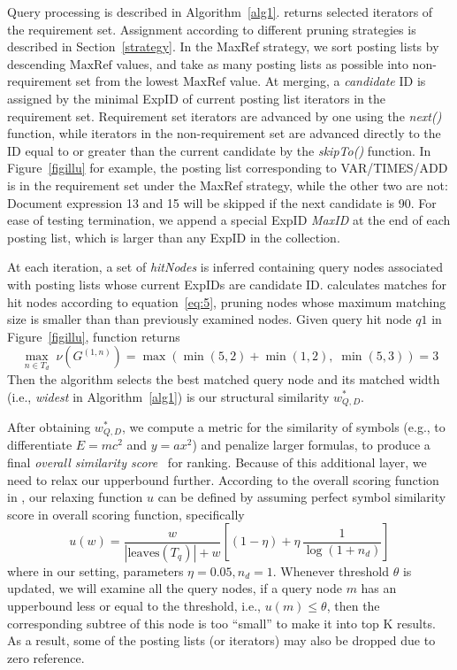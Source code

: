 \documentclass[runningheads]{llncs}
\begin{document}
Query processing is described in Algorithm~\ref{alg1}.
 returns selected iterators of the requirement set.
Assignment according to different pruning strategies is described in Section~\ref{strategy}.
%
In the MaxRef strategy, we sort posting lists by descending $\text{MaxRef}$ values, and take as many posting lists as possible into non-requirement set from the lowest $\text{MaxRef}$ value.
At merging, a \textit{candidate} ID is assigned by the minimal ExpID of current posting list iterators in the requirement set.
Requirement set iterators are advanced by one using the \textit{next()} function, while iterators in the non-requirement set are advanced directly to the ID equal to or greater than the current candidate by the \textit{skipTo()} function. In Figure~\ref{figillu} for example, the posting list corresponding to VAR/TIMES/ADD is in the requirement set under the MaxRef strategy, while the other two are not: Document expression 13 and 15 will be skipped if the next candidate is 90.
%
For ease of testing termination, we append a special ExpID \emph{MaxID} at the end of each posting list, which is larger than any ExpID in the collection.

At each iteration, a set of \textit{hitNodes} is inferred containing query nodes associated with posting lists whose current ExpIDs are candidate ID.
 calculates matches for hit nodes according to equation~\ref{eq:5}, pruning nodes whose maximum matching size is smaller than than previously examined nodes.
%
Given query hit node $q1$ in Figure~\ref{figillu}, function  returns
$$\max_{n\in T_d}\;\nu(G^{(1, n)}) = \max(\min(5, 2) + \min(1, 2),\; \min(5, 3)) = 3$$
Then the algorithm selects the best matched query node and its matched width (i.e., \emph{widest} in Algorithm~\ref{alg1}) is our structural similarity $w^*_{Q, D}$.

After obtaining $w^*_{Q, D}$, we compute a metric for the similarity of symbols (e.g., to differentiate $E=mc^2$ and $y=ax^2$) and penalize larger formulas, to produce a final \emph{overall similarity score}~\cite{a0_2019} for ranking.
Because of this additional layer, we need to relax our upperbound further.
According to the overall scoring function in \cite{a0_2019}, our relaxing function $u$ can be defined by assuming perfect symbol similarity score in overall scoring function, specifically
\begin{equation}
u(w) = \frac{w}{|\text{leaves}(T_q)| + w} \left[ (1 - \eta) + \eta \, \frac 1 {\log (1 + n_d)} \right]
\end{equation}
where in our setting,  parameters $\eta = 0.05, n_d = 1$.
%
Whenever threshold $\theta$ is updated, we will examine all the query nodes, if a query node $m$ has an upperbound less or equal to the threshold, i.e., $u(m) \le \theta$, then the corresponding subtree of this node is too ``small'' to make it into top K results. As a result, some of the posting lists (or iterators) may also be dropped due to zero reference.
\end{document}
